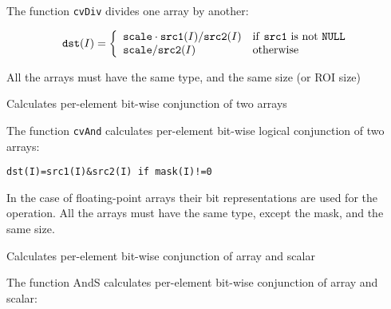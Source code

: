 The function \texttt{cvDiv} divides one array by another:

\[
\texttt{dst}(I)=\left\{ \begin{array}{l l} \texttt{scale} \cdot \texttt{src1}(I)/\texttt{src2}(I) & \mbox{if \texttt{src1} is not \texttt{NULL}}\\ \texttt{scale}/\texttt{src2}(I) & \mbox{otherwise}\\ \end{array} \right.
\]

All the arrays must have the same type, and the same size (or ROI size)



Calculates per-element bit-wise conjunction of two arrays


\begin{description}
\end{description}


The function \texttt{cvAnd} calculates per-element bit-wise logical conjunction of two arrays:

\begin{lstlisting}
dst(I)=src1(I)&src2(I) if mask(I)!=0
\end{lstlisting}

In the case of floating-point arrays their bit representations are used for the operation. All the arrays must have the same type, except the mask, and the same size.


Calculates per-element bit-wise conjunction of array and scalar


\begin{description}
\end{description}

The function AndS calculates per-element bit-wise conjunction of array and scalar:

